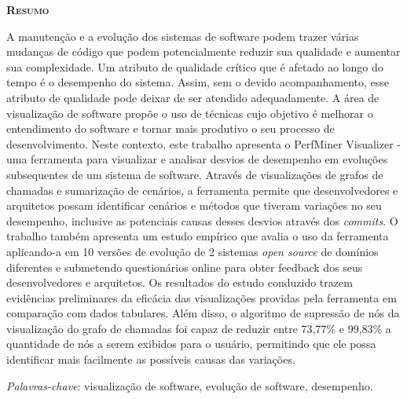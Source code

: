 \begin{center}
	{\Large{\textbf{\mscThesisTitle}}}
\end{center}

\vspace{1cm}


\vspace{1cm}

\begin{center}
	\Large{\textsc{\textbf{Resumo}}}
\end{center}

\noindent A manutenção e a evolução dos sistemas de software podem trazer várias mudanças de código que podem potencialmente reduzir sua qualidade e aumentar sua complexidade. Um atributo de qualidade crítico que é afetado ao longo do tempo é o desempenho do sistema. Assim, sem o devido acompanhamento, esse atributo de qualidade pode deixar de ser atendido adequadamente. A área de visualização de software propõe o uso de técnicas cujo objetivo é melhorar o entendimento do software e tornar mais produtivo o seu processo de desenvolvimento. Neste contexto, este trabalho apresenta o PerfMiner Visualizer - uma ferramenta para visualizar e analisar desvios de desempenho em evoluções subsequentes de um sistema de software. Através de visualizações de grafos de chamadas e sumarização de cenários, a ferramenta permite que desenvolvedores e arquitetos possam identificar cenários e métodos que tiveram variações no seu desempenho, inclusive as potenciais causas desses desvios através dos \textit{commits}. O trabalho também apresenta um estudo empírico que avalia o uso da ferramenta aplicando-a em 10 versões de evolução de 2 sistemas \textit{open source} de domínios diferentes e submetendo questionários online para obter feedback dos seus desenvolvedores e arquitetos. Os resultados do estudo conduzido trazem evidências preliminares da eficácia das visualizações providas pela ferramenta em comparação com dados tabulares. Além disso, o algoritmo de supressão de nós da visualização do grafo de chamadas foi capaz de reduzir entre 73,77\% e 99,83\% a quantidade de nós a serem exibidos para o usuário, permitindo que ele possa identificar mais facilmente as possíveis causas das variações.

\noindent\textit{Palavras-chave}: visualização de software, evolução de software, desempenho.